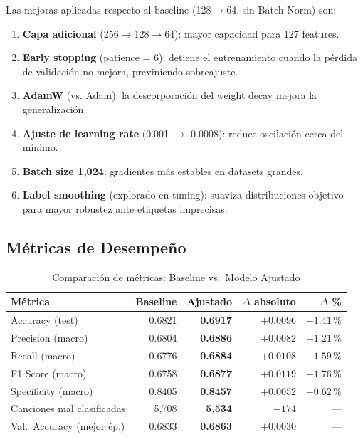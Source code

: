 \documentclass[12pt,a4paper]{article}
\begin{document}
Las mejoras aplicadas respecto al baseline (128$\rightarrow$64, sin Batch Norm) son:

\begin{enumerate}[noitemsep]
  \item \textbf{Capa adicional} (256$\rightarrow$128$\rightarrow$64): mayor capacidad para
    127 features.
  \item \textbf{Early stopping} (patience = 6): detiene el entrenamiento cuando la p\'erdida
    de validaci\'on no mejora, previniendo sobreajuste.
  \item \textbf{AdamW} (vs. Adam): la descorporaci\'on del weight decay mejora la
    generalizaci\'on.
  \item \textbf{Ajuste de learning rate} (0.001 $\rightarrow$ 0.0008): reduce oscilaci\'on
    cerca del m\'inimo.
  \item \textbf{Batch size 1{,}024}: gradientes m\'as estables en datasets grandes.
  \item \textbf{Label smoothing} (explorado en tuning): suaviza distribuciones objetivo
    para mayor robustez ante etiquetas imprecisas.
\end{enumerate}

\subsection{M\'etricas de Desempe\~no}

\begin{table}[H]
\centering
\caption{Comparaci\'on de m\'etricas: Baseline vs.\ Modelo Ajustado}
\begin{tabular}{lrrrr}
\toprule
\textbf{M\'etrica} & \textbf{Baseline} & \textbf{Ajustado} &
  $\Delta$ \textbf{absoluto} & $\Delta$ \textbf{\%} \\
\midrule
Accuracy (test)      & 0.6821 & \textbf{0.6917} & $+0.0096$ & $+1.41\,\%$ \\
Precision (macro)    & 0.6804 & \textbf{0.6886} & $+0.0082$ & $+1.21\,\%$ \\
Recall (macro)       & 0.6776 & \textbf{0.6884} & $+0.0108$ & $+1.59\,\%$ \\
F1 Score (macro)     & 0.6758 & \textbf{0.6877} & $+0.0119$ & $+1.76\,\%$ \\
Specificity (macro)  & 0.8405 & \textbf{0.8457} & $+0.0052$ & $+0.62\,\%$ \\
\midrule
Canciones mal clasificadas & 5{,}708 & \textbf{5{,}534} & $-174$ & --- \\
Val.\ Accuracy (mejor \'ep.)  & 0.6833 & \textbf{0.6863} & $+0.0030$ & --- \\
\bottomrule
\end{tabular}
\end{table}
\end{document}
